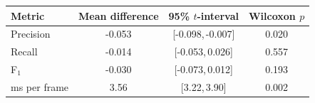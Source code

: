 \begin{tabular}{lccc}\toprule
Metric & Mean difference & 95\% $t$-interval & Wilcoxon $p$ \\\midrule
Precision & -0.053 & [-0.098,\,-0.007] & 0.020 \\
Recall & -0.014 & [-0.053,\,0.026] & 0.557 \\
F$_1$ & -0.030 & [-0.073,\,0.012] & 0.193 \\
ms per frame & 3.56 & [3.22,\,3.90] & 0.002 \\
\bottomrule\end{tabular}
